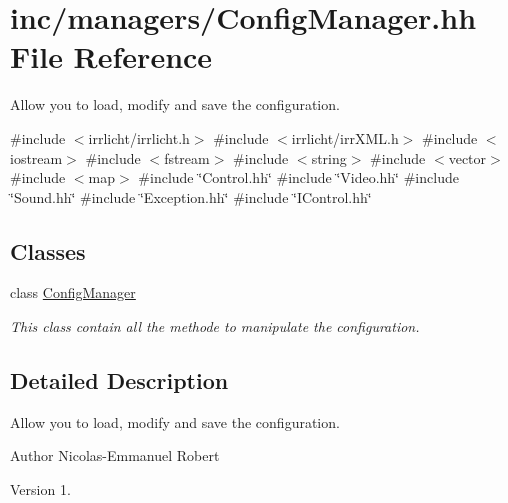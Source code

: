 \hypertarget{ConfigManager_8hh}{}\section{inc/managers/\+Config\+Manager.hh File Reference}
\label{ConfigManager_8hh}


Allow you to load, modify and save the configuration.  


{\ttfamily \#include $<$irrlicht/irrlicht.\+h$>$}\newline
{\ttfamily \#include $<$irrlicht/irr\+X\+M\+L.\+h$>$}\newline
{\ttfamily \#include $<$iostream$>$}\newline
{\ttfamily \#include $<$fstream$>$}\newline
{\ttfamily \#include $<$string$>$}\newline
{\ttfamily \#include $<$vector$>$}\newline
{\ttfamily \#include $<$map$>$}\newline
{\ttfamily \#include \char`\"{}Control.\+hh\char`\"{}}\newline
{\ttfamily \#include \char`\"{}Video.\+hh\char`\"{}}\newline
{\ttfamily \#include \char`\"{}Sound.\+hh\char`\"{}}\newline
{\ttfamily \#include \char`\"{}Exception.\+hh\char`\"{}}\newline
{\ttfamily \#include \char`\"{}I\+Control.\+hh\char`\"{}}\newline
\subsection*{Classes}
\begin{DoxyCompactItemize}
\item 
class \hyperlink{classConfigManager}{Config\+Manager}
\begin{DoxyCompactList}\small\item\em This class contain all the methode to manipulate the configuration. \end{DoxyCompactList}\end{DoxyCompactItemize}


\subsection{Detailed Description}
Allow you to load, modify and save the configuration. 

\begin{DoxyAuthor}{Author}
Nicolas-\/\+Emmanuel Robert 
\end{DoxyAuthor}
\begin{DoxyVersion}{Version}
1. 
\end{DoxyVersion}
